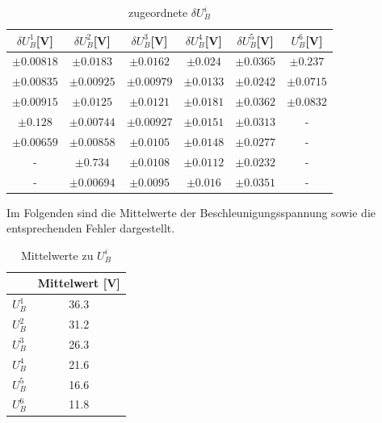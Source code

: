 \documentclass{article}
\begin{document}
\begin{multicols}{2}
\begin{table}[H]
  \centering
  \small 
  \begin{tabular}{cccccc} 
      \hline
      $\delta U^1_B$[V] & $\delta U^2_B$[V] & $\delta U^3_B$[V] & $\delta U^4_B$[V] & $\delta U^5_B$[V] & $U^6_B$[V] \\ \hline
      $\pm 0.00818$ & $\pm 0.0183$ & $\pm 0.0162$ & $\pm 0.024$ & $\pm 0.0365$ & $\pm 0.237$ \\ \hline
      $\pm 0.00835$ & $\pm 0.00925$ & $\pm 0.00979$ & $\pm 0.0133$ & $\pm 0.0242$ & $\pm 0.0715$ \\ \hline
      $\pm 0.00915$ & $\pm 0.0125$ & $\pm 0.0121$ & $\pm 0.0181$ & $\pm 0.0362$ & $\pm 0.0832$ \\ \hline
      $\pm 0.128$ & $\pm 0.00744$ & $\pm 0.00927$ & $\pm 0.0151$ & $\pm 0.0313$ & - \\ \hline
      $\pm 0.00659$ & $\pm 0.00858$ & $\pm 0.0105$ & $\pm 0.0148$ & $\pm 0.0277$ & - \\ \hline
      - & $\pm 0.734$ & $\pm 0.0108$ & $\pm 0.0112 $ & $\pm 0.0232$ & - \\ \hline
      - & $\pm 0.00694$ & $\pm 0.0095$ & $\pm 0.016$ & $\pm 0.0351$ & - \\ \hline
  \end{tabular}
  \caption{zugeordnete $\delta U^i_B$}
  \label{tab:measurements}
\end{table}
Im Folgenden sind die Mittelwerte der Beschleunigungsspannung sowie die entsprechenden Fehler dargestellt.
\begin{table}[H]
  \centering
  \begin{tabular}{cc} 
      \hline
      & Mittelwert [V] \\ \hline
      $U^1_B$ & 36.3 \\ \hline
      $U^2_B$ & 31.2 \\ \hline
      $U^3_B$ & 26.3 \\ \hline
      $U^4_B$ & 21.6 \\ \hline
      $U^5_B$ & 16.6 \\ \hline
      $U^6_B$ & 11.8 \\ \hline
  \end{tabular}
  \caption{Mittelwerte zu $U^i_B$}
  \label{tab:median_values}
\end{table}


\end{multicols}
\end{document}
